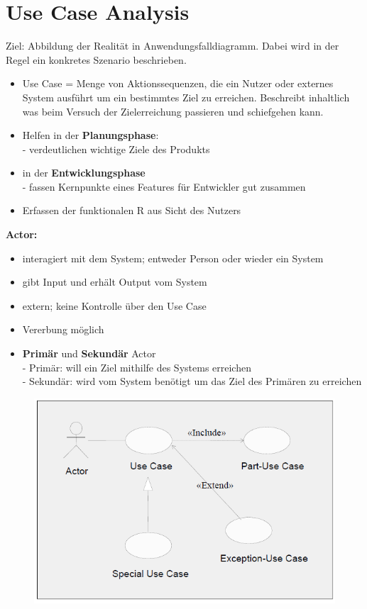 \section{Use Case Analysis}
Ziel: Abbildung der Realität in Anwendungsfalldiagramm. Dabei wird in der Regel ein konkretes Szenario beschrieben.
\begin{itemize}
	\item Use Case = Menge von Aktionssequenzen, die ein Nutzer oder externes System ausführt um ein bestimmtes Ziel zu erreichen. Beschreibt inhaltlich was beim Versuch der Zielerreichung passieren und schiefgehen kann.
	\item Helfen in der \textbf{Planungsphase}:\\
	- verdeutlichen wichtige Ziele des Produkts
	\item in der \textbf{Entwicklungsphase}\\
	- fassen Kernpunkte eines Features für Entwickler gut zusammen
	\item Erfassen der funktionalen R aus Sicht des Nutzers
\end{itemize}

\textbf{Actor:}
\begin{itemize}
	\item interagiert mit dem System; entweder Person oder wieder ein System
	\item gibt Input und erhält Output vom System
	\item extern; keine Kontrolle über den Use Case
	\item Vererbung möglich
	\item \textbf{Primär} und \textbf{Sekundär} Actor\\
	- Primär: will ein Ziel mithilfe des Systems erreichen\\
	- Sekundär: wird vom System benötigt um das Ziel des Primären zu erreichen
\end{itemize}

\begin{figure}[!h]
	\centering
	\includegraphics[scale=0.6]{img/elements_of_use_case.png}
\end{figure}